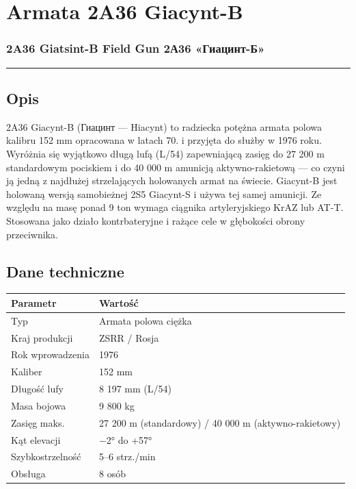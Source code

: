 \documentclass[12pt,openany,oneside]{book}
\begin{document}
\chapter{Armata 2A36 Giacynt-B}\label{armata-2a36-giacynt-b}

\subsection{2A36 Giatsint-B Field Gun \textbar{} 2А36
«Гиацинт-Б»}\label{a36-giatsint-b-field-gun-2ux43036-ux433ux438ux430ux446ux438ux43dux442-ux431}

\begin{center}\rule{0.5\linewidth}{0.5pt}\end{center}

\section{Opis}\label{opis-22}

2A36 Giacynt-B (Гиацинт --- Hiacynt) to radziecka potężna armata polowa
kalibru 152 mm opracowana w latach 70. i przyjęta do służby w 1976 roku.
Wyróżnia się wyjątkowo długą lufą (L/54) zapewniającą zasięg do 27 200 m
standardowym pociskiem i do 40 000 m amunicją aktywno-rakietową --- co
czyni ją jedną z najdłużej strzelających holowanych armat na świecie.
Giacynt-B jest holowaną wersją samobieżnej 2S5 Giacynt-S i używa tej
samej amunicji. Ze względu na masę ponad 9 ton wymaga ciągnika
artyleryjskiego KrAZ lub AT-T. Stosowana jako działo kontrbateryjne i
rażące cele w głębokości obrony przeciwnika.

\section{Dane techniczne}\label{dane-techniczne-22}

\begin{longtable}[]{@{}ll@{}}
\toprule\noalign{}
Parametr & Wartość \\
\midrule\noalign{}
\endhead
\bottomrule\noalign{}
\endlastfoot
Typ & Armata polowa ciężka \\
Kraj produkcji & ZSRR / Rosja \\
Rok wprowadzenia & 1976 \\
Kaliber & 152 mm \\
Długość lufy & 8 197 mm (L/54) \\
Masa bojowa & 9 800 kg \\
Zasięg maks. & 27 200 m (standardowy) / 40 000 m (aktywno-rakietowy) \\
Kąt elevacji & −2° do +57° \\
Szybkostrzelność & 5--6 strz./min \\
Obsługa & 8 osób \\
\end{longtable}
\end{document}
